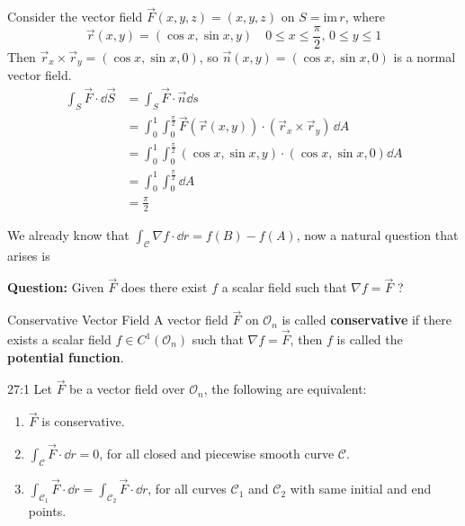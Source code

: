 \documentclass[../Analysis-3]{subfiles}
\begin{document}
\begin{Eg}{}{}
    Consider the vector field $\vec{F}(x,y,z) = (x,y,z)$ on $S = \mathrm{im} \, r$, where
    \[
        \vec{r}(x,y) = (\cos x, \sin x, y) \quad 0 \leq x \leq \frac{\pi}{2}, \, 0 \leq y \leq 1
    \]
    Then $\vec{r}_x \times \vec{r}_y = (\cos x, \sin x, 0)$, so $\vec{n}(x,y) = (\cos x, \sin x, 0)$ is a normal vector field.
    \begin{align*}
        \int_S \vec{F} \cdot \dd \vec{S} & = \int_S \vec{F} \cdot \vec{n} \dd s                                                                \\
                                         & = \int_0^1 \int_0^{\frac{\pi}{2}} \vec{F}(\vec{r}(x,y)) \cdot (\vec{r}_x \times \vec{r}_y) \, \dd A \\
                                         & = \int_0^1 \int_0^{\frac{\pi}{2}}  (\cos x, \sin x, y) \cdot (\cos x, \sin x, 0) \dd A              \\
                                         & = \int_0^1 \int_{0}^{\frac{\pi}{2}} \dd A                                                           \\
                                         & = \frac{\pi}{2}
    \end{align*}
\end{Eg}

We already know that $\int_{\mathcal{C}} \nabla f \cdot \dd r = f(B) - f(A)$, now a natural question that arises is

\textbf{Question:} Given $\vec{F}$ does there exist $f$ a scalar field such that $\nabla f = \vec{F}$ ?

\begin{Def}{Conservative Vector Field}{}
    A vector field $\vec{F}$ on $\mathcal{O}_n$ is called \textbf{conservative} if there exists a scalar field $f \in C^1(\mathcal{O}_n)$ such that $\nabla f = \vec{F}$, then $f$ is called the \textbf{potential function}.
\end{Def}

\begin{Thm}{}{27:1}
    Let $\vec{F}$ be a vector field over $\mathcal{O}_n$, the following are equivalent:
    \begin{enumerate}
        \item $\vec{F}$ is conservative.
        \item $\int_{\mathcal{C}}\vec{F} \cdot \dd r = 0$, for all closed and piecewise smooth curve $\mathcal{C}$.
        \item $\int_{\mathcal{C}_1} \vec{F} \cdot \dd r = \int_{\mathcal{C}_2} \vec{F} \cdot \dd r$, for all curves $\mathcal{C}_1$ and $\mathcal{C}_2$ with same initial and end points.
    \end{enumerate}
\end{Thm}
\end{document}
